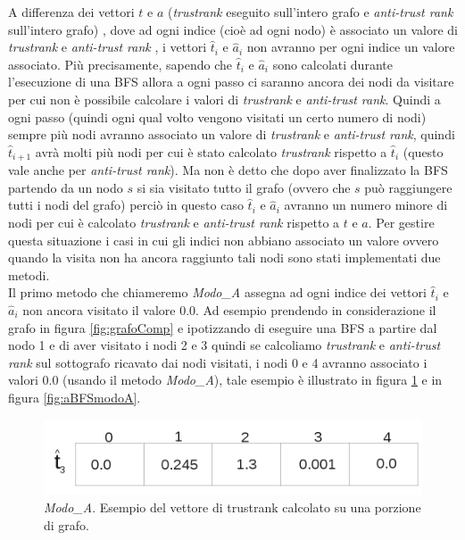 A differenza dei vettori \(t\) e \(a\) (\textit{trustrank} eseguito sull'intero grafo e \textit{anti-trust rank} sull'intero grafo) , dove ad ogni indice (cioè ad ogni nodo) è associato un valore di \textit{trustrank} e \textit{anti-trust rank} , i vettori \(\hat{t}_i\) e \(\hat{a}_i\) non avranno per ogni indice un valore associato. Più precisamente, sapendo che \(\hat{t}_i\) e \(\hat{a}_i\) sono calcolati durante l'esecuzione di una BFS allora a ogni passo ci saranno ancora dei nodi da visitare per cui non è possibile calcolare i valori di \textit{trustrank} e \textit{anti-trust rank}. Quindi a ogni passo (quindi ogni qual volto vengono visitati un certo numero di nodi) sempre più nodi avranno associato un valore di \textit{trustrank} e \textit{anti-trust rank}, quindi \(\hat{t}_{i+1}\) avrà molti più nodi per cui è stato calcolato \textit{trustrank} rispetto a \(\hat{t}_i\) (questo vale anche per \textit{anti-trust rank}). Ma non è detto che dopo aver finalizzato la BFS partendo da un nodo \(s\) si sia 
visitato tutto il grafo (ovvero che \(s\) può raggiungere tutti i nodi del grafo) perciò in questo caso \(\hat{t}_i\) e \(\hat{a}_i\) avranno un numero minore di nodi per cui è calcolato \textit{trustrank} e \textit{anti-trust rank} rispetto a \(t\) e \(a\). Per gestire questa situazione i casi in cui gli indici non abbiano associato un valore ovvero quando la visita non ha ancora raggiunto tali nodi sono stati implementati due metodi.\\ 
Il primo metodo che chiameremo \textit{Modo\_A} assegna ad ogni indice dei vettori \(\hat{t}_i\) e \(\hat{a}_i\) non ancora visitato il valore 0.0. Ad esempio prendendo in considerazione il grafo in figura \ref{fig:grafoComp} e ipotizzando di eseguire una BFS a partire dal nodo 1 e di aver visitato i nodi 2 e 3 quindi se calcoliamo \textit{trustrank} e \textit{anti-trust rank} sul sottografo ricavato dai nodi visitati, i nodi 0 e 4 avranno associato i valori 0.0 (usando il metodo \textit{Modo\_A}), tale esempio è illustrato in figura \ref{fig:tBFSmodoA} e in figura \ref{fig:aBFSmodoA}.
\begin{figure}
\centering
 \includegraphics{immagini/test/tBFSmodoA}
 \caption{\textit{Modo\_A}. Esempio del vettore di trustrank calcolato su una porzione di grafo.}
 \label{fig:tBFSmodoA}
\end{figure}
